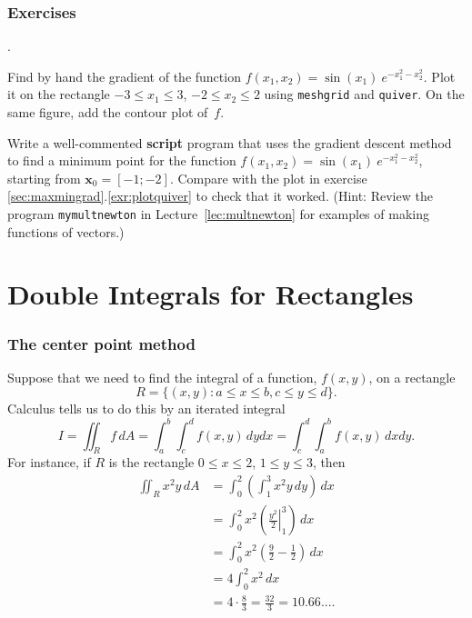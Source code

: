 \subsection*{Exercises}
\begin{list}
  {.}{}

\item \label{exr:plotquiver}
Find by hand the gradient of the function $f(x_1,x_2) = \sin(x_1) \ e^{-x_1^2 - x_2^2}$. 
   Plot it on the rectangle
  $-3 \le x_1 \le 3$, $-2 \le x_2 \le 2$ using \verb&meshgrid& and \verb&quiver&. 
  On the same figure, add the contour plot of~$f$.


\item  Write a well-commented {\bf script} program that uses the gradient descent method to find a minimum point for the function $f(x_1,x_2) = \sin(x_1) \ e^{-x_1^2 - x_2^2}$, starting from $\mathbf{x}_0 = [-1;-2]$. 
Compare with the plot in exercise \ref{sec:maxmingrad}.\ref{exr:plotquiver} to check that it worked.
(Hint: Review the program \verb*|mymultnewton| in Lecture~\ref{lec:multnewton} for examples of making functions of vectors.)

\end{list}





\chapter{Double Integrals for Rectangles}



\subsection*{The center point method}

Suppose that we need to find the integral of a function,
$f(x,y)$, on a rectangle
$$
    R = \{(x,y): a\le x \le b, c \le y \le d\}.
$$
Calculus tells us to do this by an iterated integral
$$
 I = \iint_R f \, dA = \int_a^b \int_c^d f(x,y) \, dy dx
                   = \int_c^d \int_a^b f(x,y) \, dx dy.
$$
For instance, if $R$ is the rectangle $0 \le x \le 2$, $1 \le y \le 3$, then
\begin{equation*}
\begin{split}
  \iint_R x^2 y \, dA &= \int_0^2 \left(\int_1^3 x^2 y \, dy \right) \, dx \\
           &= \int_0^2  x^2 \left(\left. \frac{y^2}{2} \right|_1^3 \right) \, dx \\
           &= \int_0^2 x^2  \left( \frac{9}{2} - \frac{1}{2} \right) \, dx \\
           &= 4 \int_0^2 x^2 \, dx\\
           &= 4 \cdot \frac{8}{3} = \frac{32}{3} = 10.66... .
\end{split}
\end{equation*}

